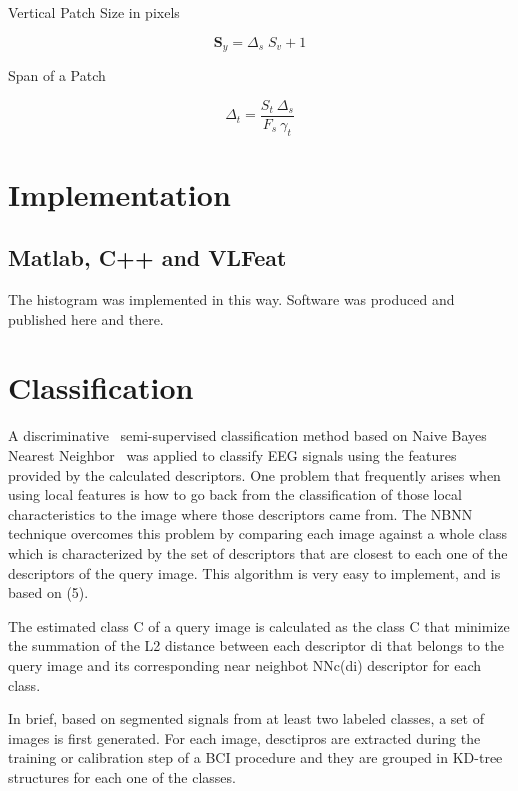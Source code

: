 Vertical Patch Size in pixels

\begin{equation}
\mathbf{S}_y = \Delta_s \; S_v + 1
\label{eq:mapping1}
\end{equation}

Span of a Patch

\begin{equation}
\Delta_t = \frac{S_t \ \Delta_s}{F_s \ \gamma_t} 
\label{eq:mapping1}
\end{equation}


\section{Implementation}

\subsection{Matlab, C++ and VLFeat}

The histogram was implemented in this way.  Software was produced and published here and there.


\section{Classification}

A discriminative~\cite{WolpawJonathanR2012} semi-supervised classification method based on Naive Bayes Nearest Neighbor~\cite{Boiman2008} was applied to classify EEG signals using the features provided by the calculated descriptors.
One problem that frequently arises when using local features is how to go back from the classification of those local characteristics to the image where those descriptors came from.
The NBNN technique overcomes this problem by comparing each image against a whole class which is characterized by the set of descriptors that are closest to each one of the descriptors of the query image. This algorithm is very easy to implement, and is based on (5).

The estimated class C of a query image is calculated as the class C that minimize the summation of the L2 distance between each descriptor di that belongs to the query image and its corresponding near neighbot NNc(di) descriptor for each class.

In brief, based on segmented signals from at least two labeled classes, a set of images is first generated.  For each image, desctipros are extracted during the training or calibration step of a BCI procedure and they are grouped in KD-tree~\cite{Lowe2004} structures for each one of the classes.

